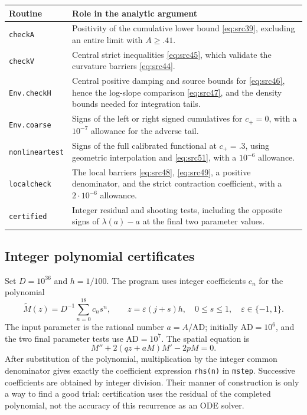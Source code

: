 \documentclass[11pt,a4paper]{article}
\numberwithin{equation}{section}
\theoremstyle{definition}
\theoremstyle{remark}
\begin{document}
\begin{center}
\begin{tabular}{p{}p{}}
Routine & Role in the analytic argument \\ \hline
\texttt{checkA} & Positivity of the cumulative lower bound
\eqref{eq:src39}, excluding an entire limit with $A\ge .41$. \\
\texttt{checkV} & Central strict inequalities
\eqref{eq:src45}, which validate the curvature barriers
\eqref{eq:src44}. \\
\texttt{Env.checkH} & Central positive damping and source bounds for
\eqref{eq:src46}, hence the log-slope comparison
\eqref{eq:src47}, and the density bounds needed for integration tails. \\
\texttt{Env.coarse} & Signs of the left or right signed cumulatives for
$c_+=0$, with a $10^{-7}$ allowance for the adverse tail. \\
\texttt{nonlineartest} & Signs of the full calibrated functional at
$c_+=.3$, using geometric interpolation and
\eqref{eq:src51}, with a $10^{-6}$ allowance. \\
\texttt{localcheck} & The local barriers \eqref{eq:src48},
\eqref{eq:src49}, a positive denominator, and the strict contraction
coefficient, with a $2\cdot10^{-6}$ allowance. \\
\texttt{certified} & Integer residual and shooting tests, including the
opposite signs of $\lambda(a)-a$ at the final two parameter values.
\end{tabular}
\end{center}

\subsection{Integer polynomial certificates}\label{cert:integer}

Set $D=10^{36}$ and $h=1/100$.  The program uses integer coefficients $c_n$
for the polynomial
\[
 \widetilde M(z)=D^{-1}\sum_{n=0}^{18}c_ns^n,
 \qquad z=\varepsilon(j+s)h,\quad 0\le s\le1,
 \quad \varepsilon\in\{-1,1\}.
\]
The input parameter is the rational number $a=A/\mathrm{AD}$; initially
$\mathrm{AD}=10^6$, and the two final parameter tests use
$\mathrm{AD}=10^7$.  The spatial equation is
\begin{equation}\label{cert:M-ode}
 M''+2(qz+aM)M'-2pM=0.
\end{equation}
After substitution of the polynomial, multiplication by the integer common
denominator gives exactly the coefficient expression \texttt{rhs(n)} in
\texttt{mstep}.  Successive coefficients are obtained by integer division.
Their manner of construction is only a way to find a good trial: certification
uses the residual of the completed polynomial, not the accuracy of this
recurrence as an ODE solver.
\end{document}
